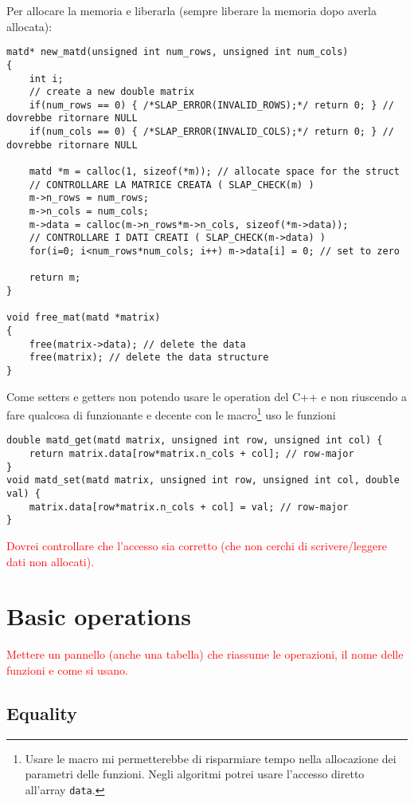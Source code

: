 \documentclass[10pt]{article}
\begin{document}
Per allocare la memoria e liberarla (sempre liberare la memoria dopo averla allocata):
\begin{lstlisting}
matd* new_matd(unsigned int num_rows, unsigned int num_cols)
{
	int i;
	// create a new double matrix
	if(num_rows == 0) { /*SLAP_ERROR(INVALID_ROWS);*/ return 0; } // dovrebbe ritornare NULL
	if(num_cols == 0) { /*SLAP_ERROR(INVALID_COLS);*/ return 0; } // dovrebbe ritornare NULL
	
	matd *m = calloc(1, sizeof(*m)); // allocate space for the struct
	// CONTROLLARE LA MATRICE CREATA ( SLAP_CHECK(m) )
	m->n_rows = num_rows;
	m->n_cols = num_cols;
	m->data = calloc(m->n_rows*m->n_cols, sizeof(*m->data));
	// CONTROLLARE I DATI CREATI ( SLAP_CHECK(m->data) )
	for(i=0; i<num_rows*num_cols; i++) m->data[i] = 0; // set to zero
	
	return m;
}

void free_mat(matd *matrix)
{
	free(matrix->data); // delete the data
	free(matrix); // delete the data structure
}
\end{lstlisting}

Come setters e getters non potendo usare le operation del C++ e non riuscendo a fare qualcosa di funzionante e decente con le macro\footnote{Usare le macro mi permetterebbe di risparmiare tempo nella allocazione dei parametri delle funzioni. Negli algoritmi potrei usare l'accesso diretto all'array \texttt{data}.} uso le funzioni
\begin{lstlisting}
double matd_get(matd matrix, unsigned int row, unsigned int col) {
	return matrix.data[row*matrix.n_cols + col]; // row-major
}
void matd_set(matd matrix, unsigned int row, unsigned int col, double val) {
	matrix.data[row*matrix.n_cols + col] = val; // row-major
}
\end{lstlisting}
\textcolor{red}{Dovrei controllare che l'accesso sia corretto (che non cerchi di scrivere/leggere dati non allocati).}



\section{Basic operations}

\textcolor{red}{Mettere un pannello (anche una tabella) che riassume le operazioni, il nome delle funzioni e come si usano.}

\subsection{Equality}
\end{document}
